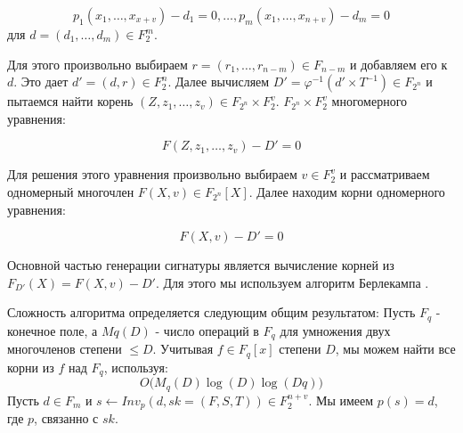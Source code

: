 \begin{equation}
p_1(x_1,\ldots,x_{x+v})-d_1=0,\ldots,p_m(x_1,\ldots,x_{n+v})-d_m=0
\end{equation}
для $d=(d_1,\ldots,d_m) \in F_2^m$.

Для этого произвольно выбираем $r = (r_1,\ldots,r_{n-m}) \in F_{n-m}$ и добавляем его к $d$. Это дает $d' = (d,r) \in F^n_2$. Далее вычисляем $D' = \varphi^{-1}(d' \times T^{-1}) \in F_{2^n}$ и пытаемся найти корень $(Z,z_1,\ldots,z_v) \in F_{2^n} \times F^v_2$.
$F_{2^n} \times F^v_2$ многомерного уравнения:

\begin{equation}
F(Z,z_1,\ldots,z_v)-D' =0
\end{equation}

Для решения этого уравнения произвольно выбираем $v \in F^v_2$ и рассматриваем одномерный многочлен $F(X,v) \in F_{2^n}[X]$. Далее находим корни одномерного уравнения:

\begin{equation}
F(X,v)-D'=0
\end{equation}

Основной частью генерации сигнатуры является вычисление корней из $F_{D'}(X)=F(X,v) - D'$. Для этого мы используем алгоритм Берлекампа \cite{Berlecamp}.

Сложность алгоритма определяется следующим общим результатом:
Пусть $F_q$ - конечное поле, а $Mq (D)$ - число операций в $F_q$ для умножения двух многочленов степени $\leqslant D$. Учитывая $f \in F_q[x]$ степени $D$, мы можем найти все корни из $f$ над $F_q$, используя:
\begin{equation}
O \Big ( M_q(D) \log (D) \log (Dq)  \Big )
\end{equation}
Пусть $d \in F_m$ и $s \leftarrow Inv_p(d,sk = (F,S,T)) \in F^{n+v}_2$. Мы имеем $p(s) = d$, где $p$, связанно с $sk$.